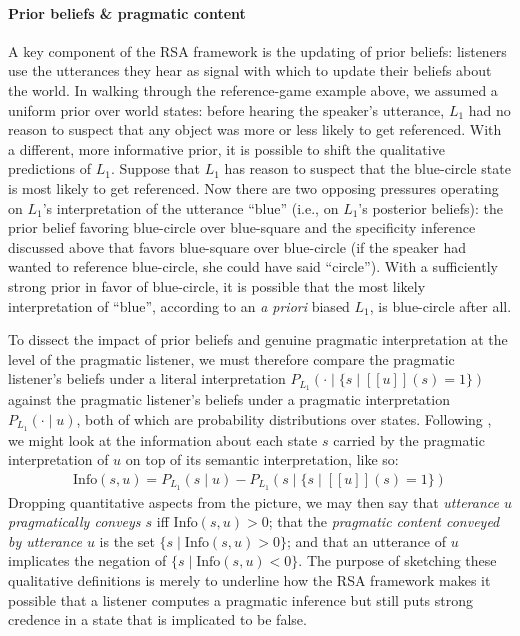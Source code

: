 \documentclass{sp}
\newcommand{\sem}[1]{\ensuremath{[\![#1]\!]}}
\begin{document}
\paragraph{Prior beliefs \& pragmatic content}
A key component of the RSA framework is the updating of prior beliefs: listeners use the utterances they hear as signal with which to update their beliefs about the world.
In walking through the reference-game example above, we assumed a uniform prior over world states: before hearing the speaker's utterance, $L_1$ had no reason to suspect that any object was more or less likely to get referenced.
With a different, more informative prior, it is possible to shift the qualitative predictions of $L_1$.
Suppose that $L_1$ has reason to suspect that the blue-circle state is most likely to get referenced.
Now there are two opposing pressures operating on $L_1$'s interpretation of the utterance ``blue'' (i.e., on $L_1$'s posterior beliefs): the prior belief favoring blue-circle over blue-square and the specificity inference discussed above that favors blue-square over blue-circle (if the speaker had wanted to reference blue-circle, she could have said ``circle'').
With a sufficiently strong prior in favor of blue-circle, it is possible that the most likely interpretation of ``blue'', according to an \emph{a priori} biased $L_1$, is blue-circle after all.

To dissect the impact of prior beliefs and genuine pragmatic interpretation at the level of the pragmatic listener, we must therefore compare the pragmatic listener's beliefs under a literal interpretation $P_{L_{1}}(\cdot \mid \{s
\mid \sem {u}(s)=1\})$ against the pragmatic listener's beliefs under a pragmatic interpretation $P_{L_{1}}(\cdot \mid u)$, both of which are probability distributions over states.
Following \cite{Skyrms2010:Signals}, we might look at the information about each state $s$ carried by the pragmatic interpretation of $u$ on top of its semantic interpretation, like so:
\begin{align*}
  \text{Info}(s, u) = { P_{L_{1}}(s \mid u) }
  -
  { P_{L_{1}}(s \mid \{s \mid \sem{u}(s)=1\}) }
\end{align*}
Dropping quantitative aspects from the picture, we may then say that \emph{utterance $u$ pragmatically conveys $s$} iff $\text{Info}(s,u) > 0$; that the \emph{pragmatic content conveyed by utterance $u$} is the set $\{s \mid \text{Info}(s,u) > 0\}$; and that an utterance of $u$ implicates the negation of $\{s \mid \text{Info}(s,u) < 0\}$.
The purpose of sketching these qualitative definitions is merely to underline how the RSA framework makes it possible that a listener computes a pragmatic inference but still puts strong credence in a state that is implicated to be false.
\end{document}
